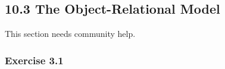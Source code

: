 \documentclass[../../main.tex]{subfiles}
\begin{document}
\subsection{10.3 The Object-Relational Model}

This section needs community help.

\subsubsection*{Exercise 3.1}
\end{document}
